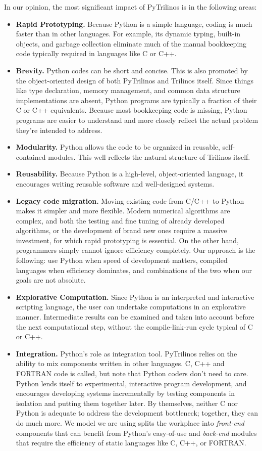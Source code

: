 \documentclass[10pt,relax]{SANDreport}
\begin{document}
In our opinion, the most significant impact of PyTrilinos is in the following
areas:
\begin{itemize}
\item {\bf Rapid Prototyping.}
Because Python is a simple language, coding is much faster than in other
  languages. For example, its dynamic typing, built-in objects, and garbage
  collection eliminate much of the manual bookkeeping code typically required
  in languages like C or C++. 
\item {\bf Brevity.} Python codes can be short and concise. This is also
promoted by the object-oriented design of both PyTrilinos and Trilinos itself.
Since things like type declaration, memory
  management, and common data structure implementations are absent, Python
  programs are typically a fraction of their C or C++ equivalents.
  Because most bookkeeping code is missing, Python programs are easier to
  understand and more closely reflect the actual problem they're intended to
  address. 
%
\item {\bf Modularity.} Python allows the code to be organized in reusable,
  self-contained modules.
  This well reflects the natural structure of Trilinos itself.
%
\item {\bf Reusability.} Because Python is a high-level, object-oriented
language, it encourages writing reusable software and well-designed systems.
%
\item {\bf Legacy code migration.} Moving existing code from C/C++ to Python
makes it simpler and more flexible.
Modern numerical
algorithms are complex, and both the testing and fine tuning of already
developed algorithms, or the development of brand new ones require a massive
investment, for which rapid prototyping is essential. On the other hand,
programmers simply cannot ignore efficiency completely. Our approach is the
following: use Python when speed of development matters, compiled languages
when efficiency dominates, and combinations of the two when our goals are
not absolute.
%
\item {\bf Explorative Computation.} Since Python is an interpreted and
interactive scripting language, the user can undertake computations in an
explorative manner. Intermediate results can be examined and taken into
account before the next computational step, without the compile-link-run cycle
typical of C or C++.
%
\item {\bf Integration.} Python's role as integration tool. PyTrilinos relies
on the ability to mix components written in other languages. C, C++ and
FORTRAN code is called, but note that Python coders don't need to care.
  Python lends itself to experimental, interactive program development, and
  encourages developing systems incrementally by testing components in
  isolation and putting them together later.
  By themselves, neither C nor Python is adequate to address the development
  bottleneck; together, they can do much more. We model we are using splits
  the workplace into {\sl front-end} components that can benefit from Python's
  easy-of-use and {\sl back-end} modules that require the efficiency of static
  languages like C, C++, or FORTRAN.
%
\end{itemize}
\end{document}
